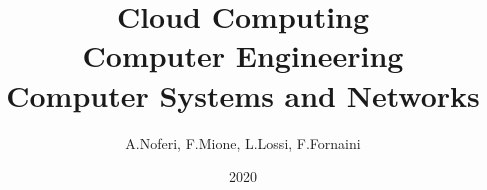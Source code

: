 \documentclass[11pt,a4paper]{article}
\title{\textbf{Cloud Computing}\\Computer Engineering\\ Computer Systems and Networks}
\author{A.Noferi, F.Mione, L.Lossi, F.Fornaini}
\date{2020}
\begin{document}
	\newcommand{\figura}[3][0.7]{
		\begin{figure}[H]
			\centering
			\texttt{[image: \#2]}
			\caption{#3}
			\label{fig:#2}
		\end{figure}
		\noindent
	}
	\newcommand{\wfigure}[5]{
		\begin{wrapfigure}[#5]{#1}{#2\textwidth}
			\vspace{-0.8 cm}
			\begin{center}
				\texttt{[image: \#3]}
			\end{center}
			\caption{#4}
			\label{fig:#3}
		\end{wrapfigure}
		\noindent
	}
	\newcommand{\duefigure}[4]{
		\begin{figure}[H]
			\centering
			\begin{minipage}{.5\textwidth}
				\centering
				\texttt{[image: \#1.png]}
				\caption{#2}
				\label{fig:#1}
			\end{minipage}%
			\begin{minipage}{.5\textwidth}
				\centering
				\texttt{[image: \#3.png]}
				\caption{#4}
				\label{fig:#3}
			\end{minipage}
		\end{figure}
		\noindent
		
	}
	\maketitle
	\newpage
	\tableofcontents
	\newpage
\end{document}
